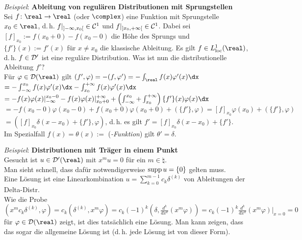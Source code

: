 \emph{Beispiel}:
\textbf{Ableitung von regulären Distributionen mit Sprungstellen}\\
Sei $f\colon \real \rightarrow \real$ (oder $\complex$) eine Funktion
mit Sprungstelle $x_0 \in \real$, d.\,h.
$f|_{\left]-\infty, x_0\right[} \in \mathcal{C}^1$ und
$f|_{\left]x_0, +\infty\right[} \in \mathcal{C}^1$.
Dabei sei $[f]_{x_0} := f(x_0 + 0) - f(x_0 - 0)$ die Höhe des Sprungs und\\
$\{f'\}(x) := f'(x)$ für $x \not= x_0$ die klassische Ableitung.
Es gilt $f \in L^1_\loc(\real)$, d.\,h. $f \in \mathcal{D}'$ ist eine reguläre
Distribution.
Was ist nun die distributionelle Ableitung $f'$?\\
Für $\varphi \in \D(\real)$ gilt
$(f', \varphi) = -(f, \varphi') = -\int_\real f(x)\varphi'(x)\dx$\\
$= -\int_{-\infty}^{x_0} f(x)\varphi'(x)\dx -
\int_{x_0}^{+\infty} f(x)\varphi'(x)\dx$\\
$= -f(x)\varphi(x)|_{-\infty}^{x_0 - 0} - f(x)\varphi(x)|_{x_0 + 0}^{+\infty} +
\left(\int_{-\infty}^{x_0} + \int_{x_0}^{+\infty}\right)
\{f'\}(x)\varphi(x)\dx$\\
$= -f(x_0 - 0)\varphi(x_0 - 0) + f(x_0 + 0)\varphi(x_0 + 0) +
(\{f'\}, \varphi) =
[f]_{x_0} \varphi(x_0) + (\{f'\}, \varphi)$\\
$= ([f]_{x_0} \delta(x - x_0) + \{f'\}, \varphi)$,
d.\,h. es gilt $f' = [f]_{x_0} \delta(x - x_0) + \{f'\}$.\\
Im Spezialfall $f(x) = \theta(x) :=$  (\emph{-Funktion})
gilt $\theta' = \delta$.

\linie

\emph{Beispiel}:
\textbf{Distributionen mit Träger in einem Punkt}\\
Gesucht ist $u \in \D'(\real)$ mit $x^m u = 0$ für ein $m \in \natural$.\\
Man sieht schnell, dass dafür notwendigerweise $\operatorname{supp} u = \{0\}$ gelten muss.\\
Eine Lösung ist eine Linearkombination $u = \sum_{k=0}^{m-1} c_k \delta^{(k)}$
von Ableitungen der Delta-Distr.\\
Wie die Probe
$(x^m c_k \delta^{(k)}, \varphi) = c_k (\delta^{(k)}, x^m \varphi) =
c_k (-1)^k (\delta, \frac{d^k}{dx^k} (x^m \varphi)) =
c_k (-1)^k \frac{d^k}{dx^k} (x^m \varphi)|_{x=0} = 0$ für
$\varphi \in \D(\real)$ zeigt, ist dies tatsächlich eine Lösung.
Man kann zeigen, dass das sogar die allgemeine Lösung ist
(d.\,h. jede Lösung ist von dieser Form).

